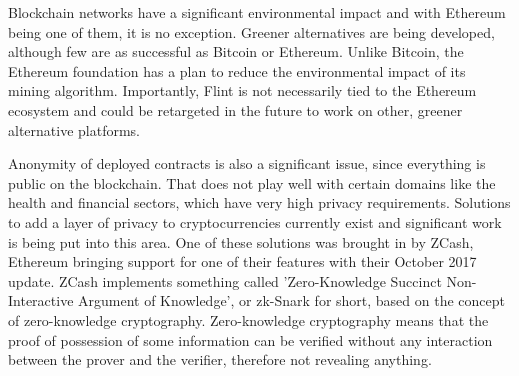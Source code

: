 Blockchain networks have a significant environmental impact and with Ethereum\cite{mb-electricity} being one of them, it is no exception. Greener alternatives are being developed, although few are as successful as Bitcoin or Ethereum. Unlike Bitcoin, the Ethereum foundation has a plan to reduce the environmental impact of its mining algorithm\cite{cd-pos}. Importantly, Flint is not necessarily tied to the Ethereum ecosystem and could be retargeted in the future to work on other, greener alternative platforms.

Anonymity of deployed contracts is also a significant issue, since everything is public on the blockchain. That does not play well with certain domains like the health and financial sectors, which have very high privacy requirements. Solutions\cite{bnc-mobius} to add a layer of privacy to cryptocurrencies currently exist and significant work is being put into this area. One of these solutions was brought in by ZCash, Ethereum bringing support for one of their features with their October 2017 update\cite{bnc-mobius}. ZCash implements something called 'Zero-Knowledge Succinct Non-Interactive Argument of Knowledge', or zk-Snark for short, based on the concept of zero-knowledge cryptography. Zero-knowledge cryptography means that the proof of possession of some information can be verified without any interaction between the prover and the verifier, therefore not revealing anything\cite{zkskarks}.
